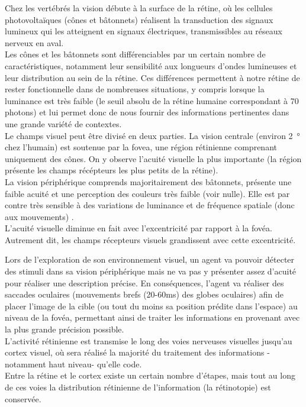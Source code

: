 Chez les vertébrés la vision débute à la surface de la rétine, où les cellules photovoltaïques (cônes et bâtonnets) réalisent la transduction des signaux lumineux qui les atteignent en signaux électriques, transmissibles au réseaux nerveux en aval.\\
Les cônes et les bâtonnets sont différenciables par un certain nombre de caractéristiques, notamment leur sensibilité aux longueurs d'ondes lumineuses et leur distribution au sein de la rétine. Ces différences permettent à notre rétine de rester fonctionnelle dans de nombreuses situations, y compris lorsque la luminance est très faible (le seuil absolu de la rétine humaine correspondant à 70 photons) et lui permet donc de nous fournir des informations pertinentes dans une grande variété de contextes.\\
Le champs visuel peut être divisé en deux parties. La vision centrale (environ \SI{2}{\degree} chez l'humain) est soutenue par la fovea, une région rétinienne comprenant uniquement des cônes. On y observe l'acuité visuelle la plus importante (la région présente les champs récépteurs les plus petits de la rétine).\\
La vision périphérique comprends majoritairement des bâtonnets, présente une faible acuité et une perception des couleurs très faible (voir nulle). Elle est par contre très sensible à des variations de luminance et de fréquence spatiale (donc aux mouvements) \autocite{Werner2014}.\\
 L'acuité visuelle diminue en fait avec l'excentricité par rapport à la fovéa. Autrement dit, les champs récepteurs visuels grandissent avec cette excentricité.

Lors de l'exploration de son environnement visuel, un agent va pouvoir détecter des stimuli dans sa vision périphérique mais ne va pas y présenter assez d'acuité pour réaliser une description précise.
En conséquences, l'agent va réaliser des saccades oculaires (mouvements brefs (20-60\si{\milli\second}) des globes oculaires) afin de placer l'image de la cible (ou tout du moins sa position prédite dans l'espace) au niveau de la fovéa, permettant ainsi de traiter les informations en provenant avec la plus grande précision possible.\\

L'activité rétinienne est transmise le long des voies nerveuses visuelles jusqu'au cortex visuel, où sera réalisé la majorité du traitement des informations -notamment haut niveau- qu'elle code. \\
Entre la rétine et le cortex existe un certain nombre d'étapes, mais tout au long de ces voies la distribution rétinienne de l'information (la rétinotopie) est conservée. 

